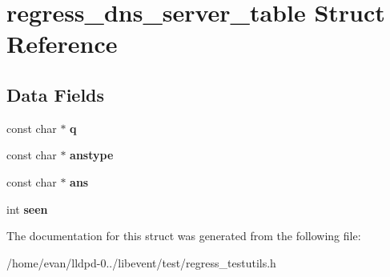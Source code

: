 \section{regress\-\_\-dns\-\_\-server\-\_\-table \-Struct \-Reference}
\label{structregress__dns__server__table}
\subsection*{\-Data \-Fields}
\begin{DoxyCompactItemize}
\item 
const char $\ast$ {\bfseries q}\label{structregress__dns__server__table_a92a0035994d77eb6cfac6800de260d91}

\item 
const char $\ast$ {\bfseries anstype}\label{structregress__dns__server__table_afbb68b4c98474925cc87bc53c8ff6a69}

\item 
const char $\ast$ {\bfseries ans}\label{structregress__dns__server__table_a3cd932ce07cb84ab9737b40913746c5e}

\item 
int {\bfseries seen}\label{structregress__dns__server__table_ab3943adbbc154b66f74f3503bc03672e}

\end{DoxyCompactItemize}


\-The documentation for this struct was generated from the following file\-:\begin{DoxyCompactItemize}
\item 
/home/evan/lldpd-\/0../libevent/test/regress\-\_\-testutils.\-h\end{DoxyCompactItemize}
